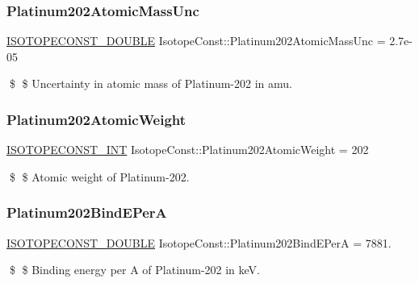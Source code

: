 \subsubsection{\texorpdfstring{Platinum202\+Atomic\+Mass\+Unc}{Platinum202AtomicMassUnc}}
{\footnotesize\ttfamily \mbox{\hyperlink{group___isotope_const-_macros_ga8f45a7272ce02c0b4c65c44636ed719a}{I\+S\+O\+T\+O\+P\+E\+C\+O\+N\+S\+T\+\_\+\+D\+O\+U\+B\+LE}} Isotope\+Const\+::\+Platinum202\+Atomic\+Mass\+Unc = 2.\+7e-\/05}

\$ \$ Uncertainty in atomic mass of Platinum-\/202 in amu. \mbox{\label{group___isotope_const-_platinum-_pt202_ga37d99060cdc2f2b85ff7f1905c476307}} 
\subsubsection{\texorpdfstring{Platinum202\+Atomic\+Weight}{Platinum202AtomicWeight}}
{\footnotesize\ttfamily \mbox{\hyperlink{group___isotope_const-_macros_ga5f18360b3e99483a35c32d789e62621c}{I\+S\+O\+T\+O\+P\+E\+C\+O\+N\+S\+T\+\_\+\+I\+NT}} Isotope\+Const\+::\+Platinum202\+Atomic\+Weight = 202}

\$ \$ Atomic weight of Platinum-\/202. \mbox{\label{group___isotope_const-_platinum-_pt202_ga86a65ef87fbc5bc38d1e76a5edf5e8e6}} 
\subsubsection{\texorpdfstring{Platinum202\+Bind\+E\+PerA}{Platinum202BindEPerA}}
{\footnotesize\ttfamily \mbox{\hyperlink{group___isotope_const-_macros_ga8f45a7272ce02c0b4c65c44636ed719a}{I\+S\+O\+T\+O\+P\+E\+C\+O\+N\+S\+T\+\_\+\+D\+O\+U\+B\+LE}} Isotope\+Const\+::\+Platinum202\+Bind\+E\+PerA = 7881.}

\$ \$ Binding energy per A of Platinum-\/202 in keV. \mbox{\label{group___isotope_const-_platinum-_pt202_gaf058c0798d44b7a2f4b0393eb5ce560f}} 
